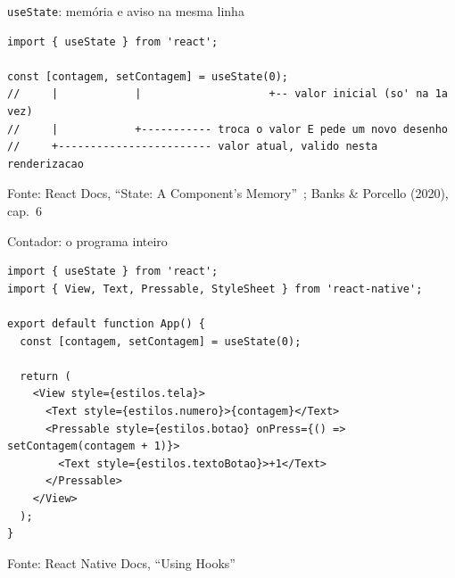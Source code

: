 \documentclass[aspectratio=169]{beamer}
\newcommand{\fonte}[1]{\vfill\hfill{\scriptsize\textcolor{UFSGray}{Fonte: #1}}}
\begin{document}
\begin{frame}[fragile]{\texttt{useState}: memória e aviso na mesma linha}
\begin{lstlisting}[style=js]
import { useState } from 'react';

const [contagem, setContagem] = useState(0);
//     |            |                    +-- valor inicial (so' na 1a vez)
//     |            +----------- troca o valor E pede um novo desenho
//     +------------------------ valor atual, valido nesta renderizacao
\end{lstlisting}
  \begin{center}
  \end{center}
  \fonte{React Docs, ``State: A Component's Memory''~\cite{react2025docs};
         Banks \& Porcello (2020), cap.\ 6~\cite{banks2020learning}}
\end{frame}

\begin{frame}[fragile]{Contador: o programa inteiro}
\begin{lstlisting}[style=js]
import { useState } from 'react';
import { View, Text, Pressable, StyleSheet } from 'react-native';

export default function App() {
  const [contagem, setContagem] = useState(0);

  return (
    <View style={estilos.tela}>
      <Text style={estilos.numero}>{contagem}</Text>
      <Pressable style={estilos.botao} onPress={() => setContagem(contagem + 1)}>
        <Text style={estilos.textoBotao}>+1</Text>
      </Pressable>
    </View>
  );
}
\end{lstlisting}
  \fonte{React Native Docs, ``Using Hooks''~\cite{reactnative2025docs}}
\end{frame}
\end{document}
